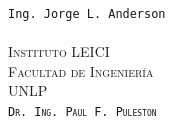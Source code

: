 \begin{titlepage}
\begin{center}
\begin{figure}[H]
\begin{subfigure}{0.3\textwidth}
                \end{subfigure}
            \end{figure}
            \vspace{0.5cm}
            \begin{multicols}{3}
                \large
                \texttt{Ing. Jorge L. Anderson}
                \\
                \vspace{0.1cm}
                \Large\scshape
                \\
                \normalfont
            \columnbreak
                \Bold\large\scshape
                Instituto LEICI
                \\
                \vspace{0.1cm}
                Facultad de Ingeniería
                \\
                \vspace{0.1cm}
                UNLP
                \\
            \columnbreak
                \vspace{0.1cm}
                \normalfont\large
                \texttt{Dr. Ing. Paul F. Puleston}
                \\
                \vspace{0.1cm}
                \Large\scshape
                \normalfont
            \end{multicols}
        \end{center}
    \end{titlepage}